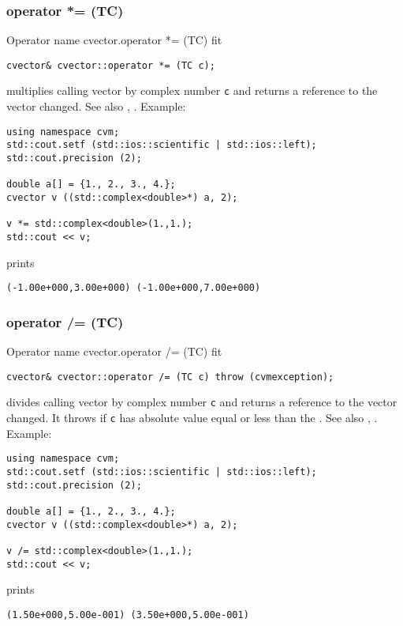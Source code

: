 \subsubsection{operator *= (TC)}
Operator%
\pdfdest name {cvector.operator *= (TC)} fit
\begin{verbatim}
cvector& cvector::operator *= (TC c);
\end{verbatim}
multiplies  calling vector by complex number \verb"c"
and returns a reference to
the vector changed.
See also ,
.
Example:
\begin{Verbatim}
using namespace cvm;
std::cout.setf (std::ios::scientific | std::ios::left);
std::cout.precision (2);

double a[] = {1., 2., 3., 4.};
cvector v ((std::complex<double>*) a, 2);

v *= std::complex<double>(1.,1.);
std::cout << v;
\end{Verbatim}
prints
\begin{Verbatim}
(-1.00e+000,3.00e+000) (-1.00e+000,7.00e+000)
\end{Verbatim}
\newpage



\subsubsection{operator /= (TC)}
Operator%
\pdfdest name {cvector.operator /= (TC)} fit
\begin{verbatim}
cvector& cvector::operator /= (TC c) throw (cvmexception);
\end{verbatim}
divides  calling vector by complex number \verb"c"
and returns a reference to
the vector changed.
It throws  
if \verb"c" has  absolute value equal or less
than the
.
See also ,
.
Example:
\begin{Verbatim}
using namespace cvm;
std::cout.setf (std::ios::scientific | std::ios::left);
std::cout.precision (2);

double a[] = {1., 2., 3., 4.};
cvector v ((std::complex<double>*) a, 2);

v /= std::complex<double>(1.,1.);
std::cout << v;
\end{Verbatim}
prints
\begin{Verbatim}
(1.50e+000,5.00e-001) (3.50e+000,5.00e-001)
\end{Verbatim}
\newpage



